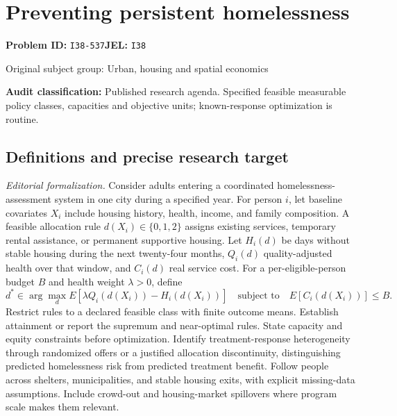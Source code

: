 \documentclass[11pt,a4paper]{article}
\begin{document}
\section*{Preventing persistent homelessness}
\textbf{Problem ID:} \texttt{I38-537}\quad \textbf{JEL:} \texttt{I38}\par
\label{problem:OP-0469}
{\sffamily\small\color{muted}Original subject group: Urban, housing and spatial economics\par}
\label{definitions:problem:30007751}
\textbf{Audit classification:} Published research agenda. Specified feasible measurable policy classes, capacities and objective units; known-response optimization is routine.
\subsection*{Definitions and precise research target}
\textit{Editorial formalization.} Consider adults entering a coordinated homelessness-assessment system in one city during a specified year. For person \(i\), let baseline covariates \(X_i\) include housing history, health, income, and family composition. A feasible allocation rule \(d(X_i)\in\{0,1,2\}\) assigns existing services, temporary rental assistance, or permanent supportive housing. Let \(H_i(d)\) be days without stable housing during the next twenty-four months, \(Q_i(d)\) quality-adjusted health over that window, and \(C_i(d)\) real service cost. For a per-eligible-person budget \(B\) and health weight \(\lambda>0\), define
\[d^*\in\arg\max_d E[\lambda Q_i(d(X_i))-H_i(d(X_i))]\quad\text{subject to}\quad E[C_i(d(X_i))]\leq B.\]
Restrict rules to a declared feasible class with finite outcome means. Establish attainment or report the supremum and near-optimal rules. State capacity and equity constraints before optimization. Identify treatment-response heterogeneity through randomized offers or a justified allocation discontinuity, distinguishing predicted homelessness risk from predicted treatment benefit. Follow people across shelters, municipalities, and stable housing exits, with explicit missing-data assumptions. Include crowd-out and housing-market spillovers where program scale makes them relevant.
\end{document}
